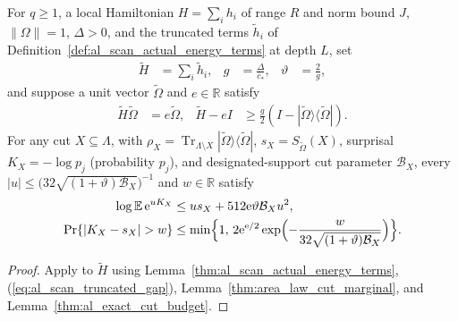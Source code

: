 \begin{lemma}
    \label{thm:al_scan_actual_marginal_tails}
    \leanok
    For $q\ge1$, a local Hamiltonian $H=\sum_i h_i$ of range $R$ and norm bound
    $J$, $\|\Omega\|=1$, $\Delta>0$, and the truncated terms $\widetilde h_i$ of
    Definition~\ref{def:al_scan_actual_energy_terms} at depth $L$, set
    \begin{align}
        \widetilde H & =\sum_i\widetilde h_i, &
        g            & =\frac{\Delta}{c_*},   &
        \vartheta    & =\frac2g,
        \label{eq:al_scan_truncated_ham_defs}
    \end{align}
    and suppose a unit vector $\widetilde\Omega$ and $e\in\mathbb R$ satisfy
    \begin{align}
        \widetilde H\widetilde\Omega & =e\widetilde\Omega, &
        \widetilde H-eI              & \ge\frac g2
        (I-|\widetilde\Omega\rangle\langle\widetilde\Omega|).
        \label{eq:al_scan_truncated_gap}
    \end{align}
    For any cut $X\subseteq\Lambda$, with
    $\rho_X=\operatorname{Tr}_{\Lambda\setminus X}
        |\widetilde\Omega\rangle\langle\widetilde\Omega|$,
    $s_X=S_{\widetilde\Omega}(X)$, surprisal $K_X=-\log p_j$ (probability $p_j$),
    and designated-support cut parameter $\mathcal B_X$, every
    $|u|\le\bigl(32\sqrt{(1+\vartheta)\mathcal B_X}\bigr)^{-1}$ and $w\in\mathbb R$
    satisfy
    \begin{align}
        \log\mathbb E\,\mathrm e^{uK_X}
         & \le us_X+512\mathrm e\vartheta\mathcal B_Xu^2,
        \label{eq:al_scan_actual_marginal_moment}         \\
        \Pr\{|K_X-s_X|>w\}
         & \le\min\Bigl\{1,\,2\mathrm e^{\mathrm e/2}
        \exp\Bigl(-\frac{w}{32\sqrt{(1+\vartheta)\mathcal B_X}}\Bigr)\Bigr\}.
        \label{eq:al_scan_actual_marginal_tail}
    \end{align}
\end{lemma}
\begin{proof}\leanok
    Apply \cite[Lemma~3.1]{OpenAI2026AreaLaw} to $\widetilde H$ using
    Lemma~\ref{thm:al_scan_actual_energy_terms}, (\ref{eq:al_scan_truncated_gap}),
    Lemma~\ref{thm:area_law_cut_marginal}, and
    Lemma~\ref{thm:al_exact_cut_budget}.
\end{proof}

